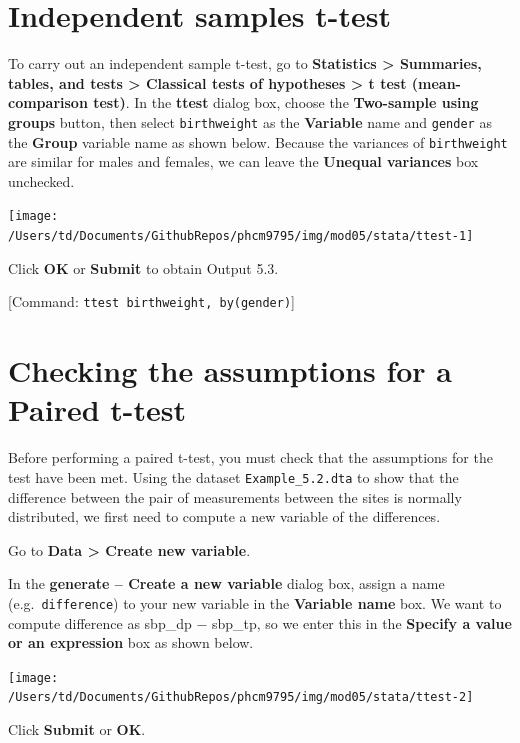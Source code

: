 \documentclass[
]{memoir}
\begin{document}
\hypertarget{independent-samples-t-test-1}{%
\section{Independent samples t-test}\label{independent-samples-t-test-1}}

To carry out an independent sample t-test, go to \textbf{Statistics \textgreater{} Summaries, tables, and tests \textgreater{} Classical tests of hypotheses \textgreater{} t test (mean-comparison test)}. In the \textbf{ttest} dialog box, choose the \textbf{Two-sample using groups} button, then select \texttt{birthweight} as the \textbf{Variable} name and \texttt{gender} as the \textbf{Group} variable name as shown below. Because the variances of \texttt{birthweight} are similar for males and females, we can leave the \textbf{Unequal variances} box unchecked.

\texttt{[image: /Users/td/Documents/GithubRepos/phcm9795/img/mod05/stata/ttest-1]}

Click \textbf{OK} or \textbf{Submit} to obtain Output 5.3.

{[}Command: \texttt{ttest\ birthweight,\ by(gender)}{]}

\hypertarget{checking-the-assumptions-for-a-paired-t-test}{%
\section{Checking the assumptions for a Paired t-test}\label{checking-the-assumptions-for-a-paired-t-test}}

Before performing a paired t-test, you must check that the assumptions for the test have been met. Using the dataset \texttt{Example\_5.2.dta} to show that the difference between the pair of measurements between the sites is normally distributed, we first need to compute a new variable of the differences.

Go to \textbf{Data \textgreater{} Create new variable}.

In the \textbf{generate -- Create a new variable} dialog box, assign a name (e.g.~\texttt{difference}) to your new variable in the \textbf{Variable name} box. We want to compute difference as sbp\_dp − sbp\_tp, so we enter this in the \textbf{Specify a value or an expression} box as shown below.

\texttt{[image: /Users/td/Documents/GithubRepos/phcm9795/img/mod05/stata/ttest-2]}

Click \textbf{Submit} or \textbf{OK}.
\end{document}
